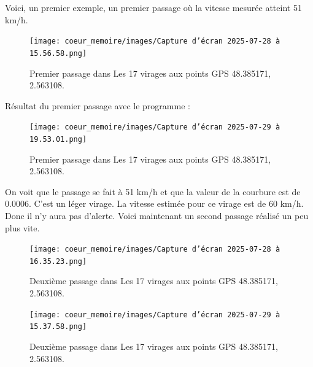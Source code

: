 Voici, un premier exemple, un premier passage où la vitesse mesurée atteint 51 km/h.
\begin{figure}[H]
    \centering
    \texttt{[image: coeur\_memoire/images/Capture d’écran 2025-07-28 à 15.56.58.png]} 
    \caption{Premier passage dans Les 17 virages aux points GPS 48.385171, 2.563108.}
\end{figure}

Résultat du premier passage avec le programme :
\begin{figure}[H]
    \centering
    \texttt{[image: coeur\_memoire/images/Capture d’écran 2025-07-29 à 19.53.01.png]} 
    \caption{Premier passage dans Les 17 virages aux points GPS 48.385171, 2.563108.}
\end{figure}
On voit que le passage se fait à 51 km/h et que la valeur de la courbure est de 0.0006. C'est un léger virage. La vitesse estimée pour ce virage est de 60 km/h. Donc il n'y aura pas d'alerte. Voici maintenant un second passage réalisé un peu plus vite.
\begin{figure}[H]
    \centering
    \texttt{[image: coeur\_memoire/images/Capture d’écran 2025-07-28 à 16.35.23.png]} 
    \caption{Deuxième passage dans Les 17 virages aux points GPS 48.385171, 2.563108.}
\end{figure}

\begin{figure}[H]
    \centering
    \texttt{[image: coeur\_memoire/images/Capture d’écran 2025-07-29 à 15.37.58.png]} 
    \caption{Deuxième passage dans Les 17 virages aux points GPS  48.385171, 2.563108.}
\end{figure}


